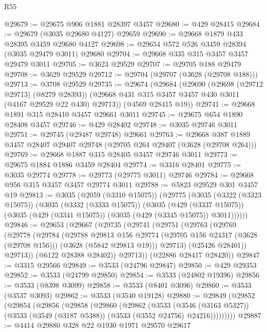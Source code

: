 \begin{lexlean}{R55}
\begin{coremodule}
@29679 := @29675 @906 @1881 @28397 @3457
@29680 := @429 @28415
@29684 := @29679 (@3035 @29680 @4127) @29659
@29690 := @29668 @1879 @433 @28395 @3459 @29680 @4127
@29698 := @29654 @572 @526 @3459 @28394 (@3035 @29479 @3011) @29680
@29704 := @29668 @335 @315 @3457 @3457 @29479 @3011
@29705 := @3623 @29529
@29707 := @29705 @188 @29479
@29708 := @3629 @29529
@29712 := @29704 (@29707 (@3628 (@29708 @188)))
@29713 := @3708 @29529
@29735 := @29674
    (@29684
      (@29690
        (@29698 (@29712 @29713) (@8279 @28393))
        (@29668 @431 @315 @3457 @3457 @430 @3011 (@4167 @29529 @22 @430) @29713))
      (@4569 @28415 @19))
@29741 := @29668 @1891 @315 @28410 @3457 @29661 @3011
@29745 := @29675 @654 @1890 @28408 @3457
@29746 := @429 @28402
@29748 := @3035 @29746 @3011
@29751 := @29745 (@29487 @29748) @29661
@29763 := @29668 @387 @1889 @3457 @28407 @29407 @29748 (@29705 @264 @29407 (@3628 (@29708 @264)))
@29769 := @29668 @1887 @315 @28405 @3457 @29746 @3011
@29773 := @29675 @1884 @1886 @3459 @28404
@29774 := @3316 @28401
@29775 := @3035 @29774
@29778 := @29773 (@29775 @3011) @29746
@29784 := @29668 @956 @315 @3457 @3457 @29774 @3011
@29788 := @5823 @29529 @301 @3457 @19
@29813 := @3035
    (@2059 (@3310 @15075))
    (@29775
      (@3035
        (@3322 (@3323 @15075))
        (@3035
          (@3332 (@3333 @15075))
          (@3035
            (@429 (@3337 @15075))
            (@3035 (@429 (@3341 @15075)) (@3035 (@429 (@3345 @15075)) @3011))))))
@29846 := @29653
    (@29667
      (@29735
        (@29741
          (@29751
            (@29763
              (@29769
                (@29778
                  (@29784
                    (@29788
                      @29813
                      @156
                      @29774
                      (@29705 @156 @24317 (@3628 (@29708 @156)))
                      (@3628 (@5842 @29813 @19)))
                    @29713)
                  (@25426 @28401))
                @29713))
            (@6122 @28388 @28402))
          @29713))
      (@22886 @28417 @28420))
@29847 := @3315 @29566
@29849 := @3533 (@24796 @29847)
@29850 := @429 @29353
@29852 := @3533 (@24799 @29850)
@29854 := @3533 (@24802 @19396)
@29856 := @3533 (@8398 @3099)
@29858 := @3533 (@8401 @3096)
@29860 := @3533 (@3537 @3093)
@29862 := @3533 (@3540 @19128)
@29880 := @29849
    (@29852
      (@29854
        (@29856
          (@29858
            (@29860
              (@29862
                (@3533
                  (@3546 (@3163 @5327))
                  (@3533 (@3549 (@3187 @5388)) (@3533 (@3552 @24756) @24216)))))))))
@29887 := @4414 @29880 @328 @22 @1930 @1971 @29570 @29617

\end{coremodule}
\end{lexlean}
